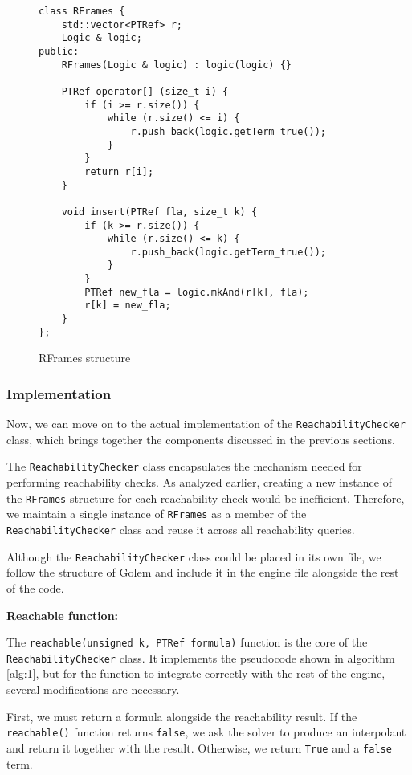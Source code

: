 \begin{figure}[H]
\begin{lstlisting}
class RFrames {
    std::vector<PTRef> r;
    Logic & logic;
public:
    RFrames(Logic & logic) : logic(logic) {}

    PTRef operator[] (size_t i) {
        if (i >= r.size()) {
            while (r.size() <= i) {
                r.push_back(logic.getTerm_true());
            }
        }
        return r[i];
    }

    void insert(PTRef fla, size_t k) {
        if (k >= r.size()) {
            while (r.size() <= k) {
                r.push_back(logic.getTerm_true());
            }
        }
        PTRef new_fla = logic.mkAnd(r[k], fla);
        r[k] = new_fla;
    }
};
\end{lstlisting}
\caption{RFrames structure}\label{code:RFrames}
\end{figure}

\subsubsection*{Implementation}
\noindent Now, we can move on to the actual implementation of the \texttt{ReachabilityChecker} class, which brings together the components discussed in the previous sections.

The \texttt{ReachabilityChecker} class encapsulates the mechanism needed for performing reachability checks.
As analyzed earlier, creating a new instance of the \texttt{RFrames} structure
for each reachability check would be inefficient. Therefore, we maintain a
single instance of \texttt{RFrames} as a member of the
\texttt{ReachabilityChecker} class and reuse it across all reachability
queries.

Although the \texttt{ReachabilityChecker} class could be placed in its own file, we follow the structure of Golem and include it in the engine file alongside the rest of the code.

\vspace{\baselineskip}
\noindent\textbf{Reachable function:}

\vspace{\baselineskip}
\noindent The \texttt{reachable(unsigned k, PTRef formula)} function is the core of the
\texttt{ReachabilityChecker} class. It implements the pseudocode shown in
algorithm \ref{alg:1}, but for the function to
integrate correctly with the rest of the engine, several modifications are
necessary.

First, we must return a formula alongside the reachability result. If the
\texttt{reachable()} function returns \texttt{false}, we ask the solver to
produce an interpolant and return it together with the result. Otherwise,
we return \texttt{True} and a \texttt{false} term.


